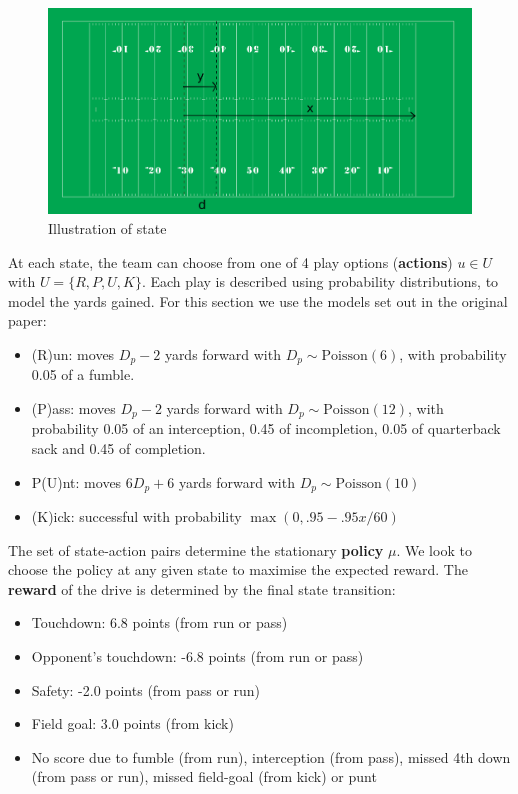 \documentclass[11pt, oneside]{article}   	%
\begin{document}
\begin{figure}[ht!]
\centering
\includegraphics[width=155mm]{../images/field.png}
\caption{Illustration of state}
\end{figure}

At each state, the team can choose from one of 4 play options (\textbf{actions}) $u \in U$ with $U=\{R, P, U, K\}$. Each play is described using probability distributions, to model the yards gained. For this section we use the models set out in the original paper:
\begin{itemize}
\item (R)un: moves $D_p - 2$ yards forward with $D_p \sim \text{Poisson}(6)$, with probability 0.05 of a fumble.
\item (P)ass: moves $D_p - 2$ yards forward with $D_p \sim \text{Poisson}(12)$, with probability 0.05 of an interception, 0.45 of incompletion, 0.05 of quarterback sack and 0.45 of completion.
\item P(U)nt: moves $6 D_p  + 6$ yards forward with $D_p \sim \text{Poisson}(10)$
\item (K)ick: successful with probability $\max(0, .95 - .95x/60)$
\end{itemize}
The set of state-action pairs determine the stationary \textbf{policy} $\mu$. We look to choose the policy at any given state to maximise the expected reward. The \textbf{reward} of the drive is determined by the final state transition:
\begin{itemize}
\item Touchdown: 6.8 points (from run or pass)
\item Opponent's touchdown: -6.8 points (from run or pass)
\item Safety: -2.0 points (from pass or run)
\item Field goal: 3.0 points (from kick)
\item No score due to fumble (from run), interception (from pass), missed 4th down (from pass or run), missed field-goal (from kick) or punt
\end{itemize}
\end{document}
